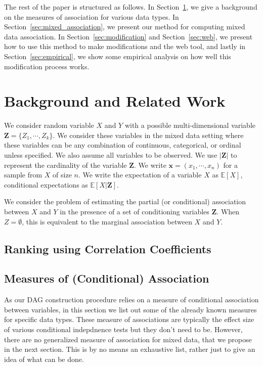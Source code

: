 \documentclass[letterpaper]{article} %
\begin{document}
The rest of the paper is structured as follows. In
Section~\ref{sec:background}, we give a background on the measures of
association for various data types. In Section~\ref{sec:mixed_association}, we
present our method for computing mixed data association. In
Section~\ref{sec:modification} and Section~\ref{sec:web}, we present how to use
this method to make modifications and the web tool, and lastly in
Section~\ref{sec:empirical}, we show some empirical analysis on how well this
modification process works.

\section{Background and Related Work}
\label{sec:background}
We consider random variable $ X $ and $ Y $ with a possible multi-dimensional
variable $ \bm{Z} = \{ Z_1, \cdots, Z_k \} $. We consider these variables in
the mixed data setting where these variables can be any combination of
continuous, categorical, or ordinal unless specified. We also assume all
variables to be observed. We use $ \rvert \bm{Z} \rvert $ to represent the
cardinality of the variable $ \bm{Z} $. We write $ \bm{x} = (x_1, \cdots, x_n)
$ for a sample from $ X $ of size $ n $. We write the expectation of a variable
$ X $ as $ \mathbb{E}[X] $, conditional expectations as $ \mathbb{E}[X |
\bm{Z}] $.

We consider the problem of estimating the partial (or conditional) association
between $ X $ and $ Y $ in the presence of a set of conditioning variables $
\bm{Z} $. When $ Z = \emptyset $, this is equivalent to the marginal
association between $ X $ and $ Y $.

\subsection{Ranking using Correlation Coefficients}

\subsection{Measures of (Conditional) Association}
As our DAG construction procedure relies on a measure of conditional
association between variables, in this section we list out some of the already
known measures for specific data types. These measure of associations are
typically the effect size of various conditional indepdnence tests but they
don't need to be. However, there are no generalized measure of association for
mixed data, that we propose in the next section. This is by no means an
exhaustive list, rather just to give an idea of what can be done.
\end{document}
